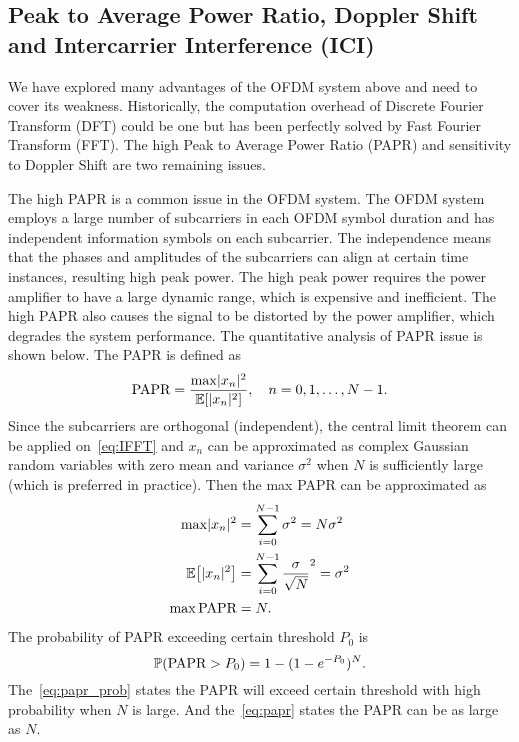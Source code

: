 \subsection{Peak to Average Power Ratio, Doppler Shift and Intercarrier Interference (ICI)}
We have explored many advantages of the OFDM system above and need to cover its weakness. Historically, the computation overhead of Discrete Fourier Transform (DFT) could be one but has been perfectly solved by Fast Fourier Transform (FFT). The high Peak to Average Power Ratio (PAPR) and sensitivity to Doppler Shift are two remaining issues.

The high PAPR is a common issue in the OFDM system. The OFDM system employs a large number of subcarriers in each OFDM symbol duration and has independent information symbols on each subcarrier. The independence means that the phases and amplitudes of the subcarriers can align at certain time instances, resulting high peak power. The high peak power requires the power amplifier to have a large dynamic range, which is expensive and inefficient. The high PAPR also causes the signal to be distorted by the power amplifier, which degrades the system performance. The quantitative analysis of PAPR issue is shown below. The PAPR is defined as
\begin{equation}
    \text{PAPR} = \frac{\max\abs{x_n}^2}{\E{\abs{x_n}^2}}, \quad n=0,1,\ldots,N-1.
\end{equation}
Since the subcarriers are orthogonal (independent), the central limit theorem can be applied on~\cref{eq:IFFT} and $x_n$ can be approximated as complex Gaussian random variables with zero mean and variance $\sigma^2$ when $N$ is sufficiently large (which is preferred in practice). Then the max PAPR can be approximated as
\begin{align}
    \max\abs{x_n}^2
    &= \sum_{i=0}^{N-1} \sigma^2 = N\sigma^2 \\
    \E{\abs{x_n}^2}
    &= \sum_{i=0}^{N-1} \frac{\sigma}{\sqrt{N}}^2 = \sigma^2 \\
    \max\text{PAPR}
    &= N. \label{eq:papr}
\end{align}
The probability of PAPR exceeding certain threshold $P_0$ is
\begin{equation}
    \label{eq:papr_prob}
    \P{\text{PAPR}>P_0} = 1 - (1-e^{-P_0})^N.
\end{equation}
The~\cref{eq:papr_prob} states the PAPR will exceed certain threshold with high probability when $N$ is large. And the~\cref{eq:papr} states the PAPR can be as large as $N$.



